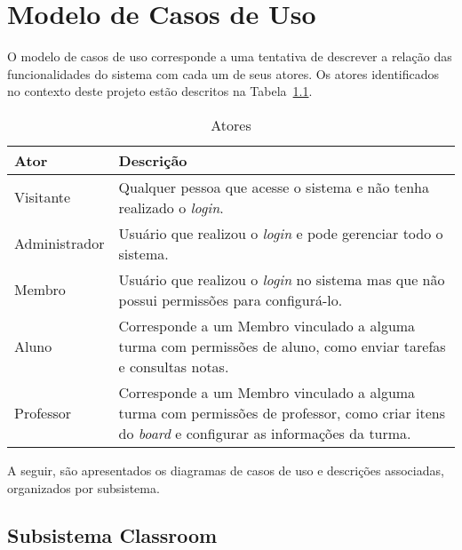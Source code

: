 \chapter{Modelo de Casos de Uso}
\label{sec-caso-de-uso}

                                      \renewcommand*\theuccount{UC-\arabic{uccount}}
\newcommand*\UC{\refstepcounter{uccount}\theuccount}      \setcounter{uccount}{0}

O modelo de casos de uso corresponde a uma tentativa de descrever a relação das funcionalidades do sistema com cada um de seus atores. Os atores identificados no contexto deste projeto estão descritos na Tabela~\ref{tabela-atores}.

\begin{table}[H]
	\centering \vspace{0.5cm} \caption{ Atores}
	\begin{tabular}{|p{3cm}|p{12cm}|} \hline \rowcolor[rgb]{0.8,0.8,0.8}
		Ator & Descrição \\\hline                              
		Visitante & Qualquer pessoa que acesse o sistema e não tenha realizado o \textit{login}. \\\hline                              
		Administrador & Usuário que realizou o \textit{login} e pode gerenciar todo o sistema. \\\hline                              
		Membro & Usuário que realizou o \textit{login} no sistema mas que não possui permissões para configurá-lo. \\\hline	                              
		Aluno & Corresponde a um Membro vinculado a alguma turma com permissões de aluno, como enviar tarefas e consultas notas. \\\hline	                              
		Professor & Corresponde a um Membro vinculado a alguma turma com permissões de professor, como criar itens do \textit{board} e configurar as informações da turma. \\\hline			 
	\end{tabular}
	\label{tabela-atores}	
\end{table}

A seguir, são apresentados os diagramas de casos de uso e descrições associadas, organizados por subsistema.
	
\section{Subsistema Classroom}

